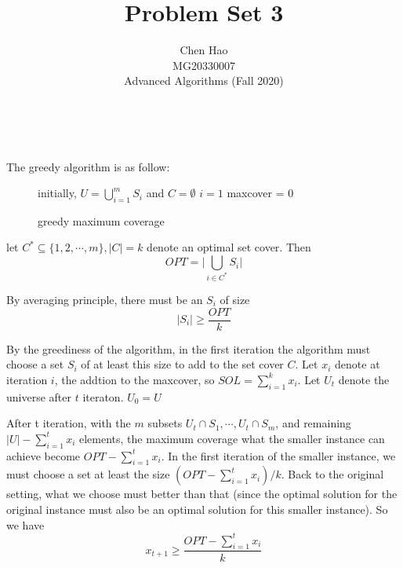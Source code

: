\documentclass[12pt]{article}
\newenvironment{solution}[2][Solution]{\begin{trivlist}
\item[\hskip \labelsep {\bfseries #1}\hskip \labelsep {\bfseries #2.}]}{\end{trivlist}}
\begin{document}

\title{Problem Set 3}%
\author{Chen Hao \\ MG20330007\\ %
    Advanced Algorithms (Fall 2020)} %

\maketitle

\begin{solution}{1}
    ~

    The greedy algorithm is as follow:

    \begin{figure}[ht]
        \centering
        \begin{minipage}{.7\linewidth}
            \begin{algorithm}[H]
                \caption{greedy maximum coverage}
                initially, $U=\bigcup_{i=1}^mS_i$ and $C=\emptyset$\;
                $i = 1$ \;
                maxcover = 0\;
            \end{algorithm}
        \end{minipage}
    \end{figure}
    let $C^* \subseteq \{1, 2, \cdots, m\}, |C| = k$ denote an optimal set cover. Then
    \[OPT = \Big|\bigcup_{i\in C^*}S_i\Big|\]

    By averaging principle, there must be an $S_i$ of size
    \[|S_i| \geq \frac{OPT}k \]

    By the greediness of the algorithm, in the first iteration the algorithm must choose a set $S_i$ of at least this size to add to the set cover $C$.
    Let $x_i$ denote at iteration $i$, the addtion to the maxcover, so $SOL =\sum_{i=1}^kx_i$. Let $U_t$ denote the universe after $t$ iteraton. $U_0 = U$

    After t iteration, with the $m$ subsets $U_t \cap S_1, \cdots, U_t \cap S_m$, and remaining $|U|-\sum_{i=1}^t x_i$ elements, the maximum coverage
    what the smaller instance can achieve become $OPT-\sum_{i=1}^t x_i$. In the first iteration of the smaller instance, we must choose a set at least the
    size $(OPT-\sum_{i=1}^t x_i)/{k}$. Back to the original setting, what we choose must better than that (since the optimal solution for the original
    instance must also be an optimal solution for this smaller instance). So we have
    \[x_{t+1} \geq \frac{OPT-\sum_{i=1}^t x_i}{k} \]


\end{solution}
\end{document}
